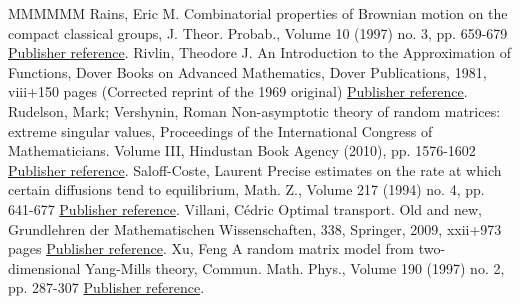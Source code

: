 \documentclass[11pt]{article}
\theoremstyle{definition}
\numberwithin{equation}{section}
\numberwithin{figure}{section}
\numberwithin{table}{section}
\begin{document}
\begin{thebibliography}{MMMMMM}
 Rains, Eric M. Combinatorial properties of Brownian motion on the compact classical groups, J. Theor. Probab., Volume 10 (1997) no. 3, pp. 659-679 \href{https://ahl.centre-mersenne.org/item/AHL_2018__1__247_0/#Rains1997}{Publisher reference}.
 Rivlin, Theodore J. An Introduction to the Approximation of Functions, Dover Books on Advanced Mathematics, Dover Publications, 1981, viii+150 pages (Corrected reprint of the 1969 original) \href{https://ahl.centre-mersenne.org/item/AHL_2018__1__247_0/#Rivlin1981}{Publisher reference}.
 Rudelson, Mark; Vershynin, Roman Non-asymptotic theory of random matrices: extreme singular values, Proceedings of the International Congress of Mathematicians. Volume III, Hindustan Book Agency (2010), pp. 1576-1602 \href{https://ahl.centre-mersenne.org/item/AHL_2018__1__247_0/#RudVer10}{Publisher reference}.
 Saloff-Coste, Laurent Precise estimates on the rate at which certain diffusions tend to equilibrium, Math. Z., Volume 217 (1994) no. 4, pp. 641-677 \href{https://ahl.centre-mersenne.org/item/AHL_2018__1__247_0/#SC1994b}{Publisher reference}.
 Villani, Cédric Optimal transport. Old and new, Grundlehren der Mathematischen Wissenschaften, 338, Springer, 2009, xxii+973 pages \href{https://ahl.centre-mersenne.org/item/AHL_2018__1__247_0/#Vil}{Publisher reference}.
 Xu, Feng A random matrix model from two-dimensional Yang-Mills theory, Commun. Math. Phys., Volume 190 (1997) no. 2, pp. 287-307 \href{https://ahl.centre-mersenne.org/item/AHL_2018__1__247_0/#Xu1997}{Publisher reference}.
\end{thebibliography}
\end{document}
